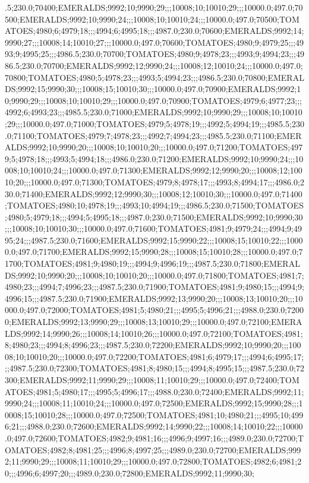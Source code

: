 .5;230.0;70400;EMERALDS;9992;10;9990;29;;;10008;10;10010;29;;;10000.0;497.0;70500;EMERALDS;9992;10;9990;24;;;10008;10;10010;24;;;10000.0;497.0;70500;TOMATOES;4980;6;4979;18;;;4994;6;4995;18;;;4987.0;230.0;70600;EMERALDS;9992;14;9990;27;;;10008;14;10010;27;;;10000.0;497.0;70600;TOMATOES;4980;9;4979;25;;;4993;9;4995;25;;;4986.5;230.0;70700;TOMATOES;4980;9;4978;23;;;4993;9;4994;23;;;4986.5;230.0;70700;EMERALDS;9992;12;9990;24;;;10008;12;10010;24;;;10000.0;497.0;70800;TOMATOES;4980;5;4978;23;;;4993;5;4994;23;;;4986.5;230.0;70800;EMERALDS;9992;15;9990;30;;;10008;15;10010;30;;;10000.0;497.0;70900;EMERALDS;9992;10;9990;29;;;10008;10;10010;29;;;10000.0;497.0;70900;TOMATOES;4979;6;4977;23;;;4992;6;4993;23;;;4985.5;230.0;71000;EMERALDS;9992;10;9990;29;;;10008;10;10010;29;;;10000.0;497.0;71000;TOMATOES;4979;5;4978;19;;;4992;5;4994;19;;;4985.5;230.0;71100;TOMATOES;4979;7;4978;23;;;4992;7;4994;23;;;4985.5;230.0;71100;EMERALDS;9992;10;9990;20;;;10008;10;10010;20;;;10000.0;497.0;71200;TOMATOES;4979;5;4978;18;;;4993;5;4994;18;;;4986.0;230.0;71200;EMERALDS;9992;10;9990;24;;;10008;10;10010;24;;;10000.0;497.0;71300;EMERALDS;9992;12;9990;20;;;10008;12;10010;20;;;10000.0;497.0;71300;TOMATOES;4979;8;4978;17;;;4993;8;4994;17;;;4986.0;230.0;71400;EMERALDS;9992;12;9990;30;;;10008;12;10010;30;;;10000.0;497.0;71400;TOMATOES;4980;10;4978;19;;;4993;10;4994;19;;;4986.5;230.0;71500;TOMATOES;4980;5;4979;18;;;4994;5;4995;18;;;4987.0;230.0;71500;EMERALDS;9992;10;9990;30;;;10008;10;10010;30;;;10000.0;497.0;71600;TOMATOES;4981;9;4979;24;;;4994;9;4995;24;;;4987.5;230.0;71600;EMERALDS;9992;15;9990;22;;;10008;15;10010;22;;;10000.0;497.0;71700;EMERALDS;9992;15;9990;28;;;10008;15;10010;28;;;10000.0;497.0;71700;TOMATOES;4981;9;4980;19;;;4994;9;4996;19;;;4987.5;230.0;71800;EMERALDS;9992;10;9990;20;;;10008;10;10010;20;;;10000.0;497.0;71800;TOMATOES;4981;7;4980;23;;;4994;7;4996;23;;;4987.5;230.0;71900;TOMATOES;4981;9;4980;15;;;4994;9;4996;15;;;4987.5;230.0;71900;EMERALDS;9992;13;9990;20;;;10008;13;10010;20;;;10000.0;497.0;72000;TOMATOES;4981;5;4980;21;;;4995;5;4996;21;;;4988.0;230.0;72000;EMERALDS;9992;13;9990;29;;;10008;13;10010;29;;;10000.0;497.0;72100;EMERALDS;9992;14;9990;26;;;10008;14;10010;26;;;10000.0;497.0;72100;TOMATOES;4981;8;4980;23;;;4994;8;4996;23;;;4987.5;230.0;72200;EMERALDS;9992;10;9990;20;;;10008;10;10010;20;;;10000.0;497.0;72200;TOMATOES;4981;6;4979;17;;;4994;6;4995;17;;;4987.5;230.0;72300;TOMATOES;4981;8;4980;15;;;4994;8;4995;15;;;4987.5;230.0;72300;EMERALDS;9992;11;9990;29;;;10008;11;10010;29;;;10000.0;497.0;72400;TOMATOES;4981;5;4980;17;;;4995;5;4996;17;;;4988.0;230.0;72400;EMERALDS;9992;11;9990;24;;;10008;11;10010;24;;;10000.0;497.0;72500;EMERALDS;9992;15;9990;28;;;10008;15;10010;28;;;10000.0;497.0;72500;TOMATOES;4981;10;4980;21;;;4995;10;4996;21;;;4988.0;230.0;72600;EMERALDS;9992;14;9990;22;;;10008;14;10010;22;;;10000.0;497.0;72600;TOMATOES;4982;9;4981;16;;;4996;9;4997;16;;;4989.0;230.0;72700;TOMATOES;4982;8;4981;25;;;4996;8;4997;25;;;4989.0;230.0;72700;EMERALDS;9992;11;9990;29;;;10008;11;10010;29;;;10000.0;497.0;72800;TOMATOES;4982;6;4981;20;;;4996;6;4997;20;;;4989.0;230.0;72800;EMERALDS;9992;11;9990;30;